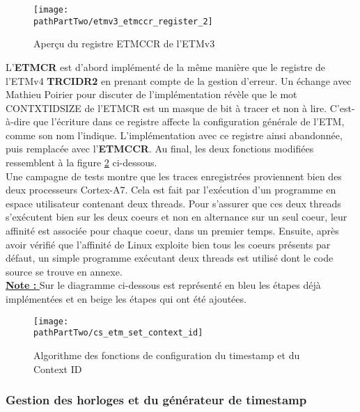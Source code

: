 \begin{figure}[H]
	\begin{center}
		\texttt{[image: \\pathPartTwo/etmv3\_etmccr\_register\_2]}
		\caption{Aperçu du registre ETMCCR de l'ETMv3}
	    \label{fig:etmv3_etmccr_register}
	\end{center}
\end{figure}

L'\textbf{ETMCR} est d'abord implémenté de la même manière que le registre de
l'ETMv4 \textbf{TRCIDR2} en prenant compte de la gestion d'erreur. Un échange
avec Mathieu Poirier pour discuter de l'implémentation révèle que le mot
CONTXTIDSIZE de l'ETMCR est un masque de bit à tracer et non à lire.
C'est-à-dire que l'écriture dans ce registre affecte la configuration
générale de l'ETM, comme son nom l'indique. L'implémentation avec ce registre
ainsi abandonnée, puis remplacée avec l'\textbf{ETMCCR}. Au final, les deux
fonctions modifiées ressemblent à la figure \ref{fig:cs_etm_set_context_id}
ci-dessous. \\

Une campagne de tests montre que les traces enregistrées proviennent bien des
deux processeurs Cortex-A7. Cela est fait par l'exécution d'un programme en
espace utilisateur contenant deux threads. Pour s'assurer que ces deux threads
s'exécutent bien sur les deux coeurs et non en alternance sur un seul coeur,
leur affinité est associée pour chaque coeur, dans un premier temps. Ensuite,
après avoir vérifié que l'affinité de Linux exploite bien tous les coeurs
présents par défaut, un simple programme exécutant deux threads est utilisé
dont le code source se trouve en annexe. \\

\underline{\textbf{Note : }} Sur le diagramme ci-dessous est représenté en
bleu les étapes déjà implémentées et en beige les étapes qui ont été ajoutées. 


\begin{figure}[H]
	\begin{center}
		\texttt{[image: \\pathPartTwo/cs\_etm\_set\_context\_id]}
		\caption{Algorithme des fonctions de configuration du timestamp et du Context ID}
	    \label{fig:cs_etm_set_context_id}
	\end{center}
\end{figure}

\subsubsection{Gestion des horloges et du générateur de timestamp}
\label{sec:clocks_and_tsgen}

